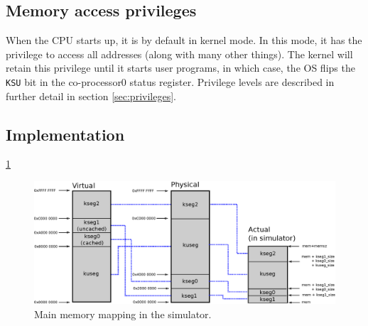 \subsection{Memory access privileges}
When the CPU starts up, it is by default in kernel mode. In this mode, it has
the privilege to access all addresses (along with many other things). The
kernel will retain this privilege until it starts user programs, in which case,
the OS flips the \texttt{KSU} bit in the co-processor0 status register\cite{harvard_mips_summary}.
Privilege levels are described in further detail in section
\ref{sec:privileges}.

\subsection{Implementation}


\ref{fig:address_space_mapping}


\begin{figure}[h]
	\includegraphics[width=\textwidth]{mmu/memory_mapping.eps}
	\caption{Main memory mapping in the simulator.}
	\label{fig:address_space_mapping}
\end{figure}


